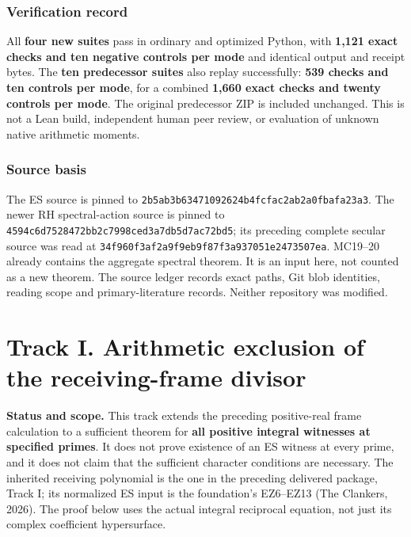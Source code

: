 \subsubsection{Verification record}\label{verification-record}

All \textbf{four new suites} pass in ordinary and optimized Python, with
\textbf{1,121 exact checks and ten negative controls per mode} and
identical output and receipt bytes. The \textbf{ten predecessor suites}
also replay successfully: \textbf{539 checks and ten controls per mode},
for a combined \textbf{1,660 exact checks and twenty controls per mode}.
The original predecessor ZIP is included unchanged. This is not a Lean
build, independent human peer review, or evaluation of unknown native
arithmetic moments.

\subsubsection{Source basis}\label{source-basis}

The ES source is pinned to
\texttt{2b5ab3b63471092624b4fcfac2ab2a0fbafa23a3}. The newer RH
spectral-action source is pinned to
\texttt{4594c6d7528472bb2c7998ced3a7db5d7ac72bd5}; its preceding
complete secular source was read at
\texttt{34f960f3af2a9f9eb9f87f3a937051e2473507ea}. MC19--20 already
contains the aggregate spectral theorem. It is an input here, not
counted as a new theorem. The source ledger records exact paths, Git
blob identities, reading scope and primary-literature records. Neither
repository was modified.

\newpage

\section{Track I. Arithmetic exclusion of the receiving-frame
divisor}\label{track-i.-arithmetic-exclusion-of-the-receiving-frame-divisor}

\textbf{Status and scope.} This track extends the preceding
positive-real frame calculation to a sufficient theorem for \textbf{all
positive integral witnesses at specified primes}. It does not prove
existence of an ES witness at every prime, and it does not claim that
the sufficient character conditions are necessary. The inherited
receiving polynomial is the one in the preceding delivered package,
Track I; its normalized ES input is the foundation's EZ6--EZ13 (The
Clankers, 2026). The proof below uses the actual integral reciprocal
equation, not just its complex coefficient hypersurface.


